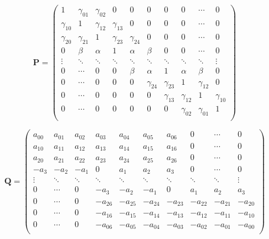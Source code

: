 \[
\mathbf{P} = 
\left(
\begin{array}{ccccccccccc}
1 & \gamma_{01} & \gamma_{02} & 0 & 0 & 0 & 0 & 0 & \cdots & 0 \\
\gamma_{10} & 1 & \gamma_{12} & \gamma_{13} & 0 & 0 & 0 & 0 & \cdots & 0 \\
\gamma_{20} & \gamma_{21} & 1 & \gamma_{23} & \gamma_{24} & 0 & 0 & 0 & \cdots & 0 \\
0 & \beta & \alpha & 1 & \alpha & \beta & 0 & 0 & \cdots & 0 \\
\vdots & \ddots & \ddots & \ddots & \ddots & \ddots & \ddots & \ddots & \ddots & \vdots \\
0 & \cdots & 0 & 0 & \beta & \alpha & 1 & \alpha & \beta & 0 \\
0 & \cdots & 0 & 0 & 0 & \gamma_{24} & \gamma_{23} & 1 & \gamma_{12} & 0 \\
0 & \cdots & 0 & 0 & 0 & 0 & \gamma_{13} & \gamma_{12} & 1 & \gamma_{10} \\
0 & \cdots & 0 & 0 & 0 & 0 & 0 & \gamma_{02} & \gamma_{01} & 1 \\
\end{array}
\right)
\]

\[
\mathbf{Q} = 
\left(
\begin{array}{ccccccccccc}
a_{00} & a_{01} & a_{02} & a_{03} & a_{04} & a_{05} & a_{06} & 0 & \cdots & 0 \\
a_{10} & a_{11} & a_{12} & a_{13} & a_{14} & a_{15} & a_{16} & 0 & \cdots & 0 \\
a_{20} & a_{21} & a_{22} & a_{23} & a_{24} & a_{25} & a_{26} & 0 & \cdots & 0 \\
-a_3 & -a_2 & -a_1 & 0 & a_1 & a_2 & a_3 & 0 & \cdots & 0 \\
\vdots & \ddots & \ddots & \ddots & \ddots & \ddots & \ddots & \ddots & \ddots & \vdots \\
0 & \cdots & 0 & -a_3 & -a_2 & -a_1 & 0 & a_1 & a_2 & a_3 \\
0 & \cdots & 0 & -a_{26} & -a_{25} & -a_{24} & -a_{23} & -a_{22} & -a_{21} & -a_{20} \\
0 & \cdots & 0 & -a_{16} & -a_{15} & -a_{14} & -a_{13} & -a_{12} & -a_{11} & -a_{10} \\
0 & \cdots & 0 & -a_{06} & -a_{05} & -a_{04} & -a_{03} & -a_{02} & -a_{01} & -a_{00} \\
\end{array}
\right)
\]



